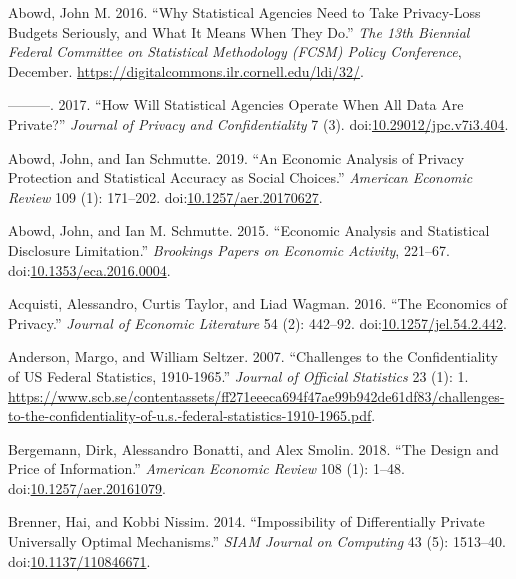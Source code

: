 \documentclass[]{article}
\begin{document}
\hypertarget{ref-abowd:fcsm:2016}{}
Abowd, John M. 2016. ``Why Statistical Agencies Need to Take
Privacy-Loss Budgets Seriously, and What It Means When They Do.''
\emph{The 13th Biennial Federal Committee on Statistical Methodology
(FCSM) Policy Conference}, December.
\url{https://digitalcommons.ilr.cornell.edu/ldi/32/}.

\hypertarget{ref-Abowd:JPC:2017}{}
---------. 2017. ``How Will Statistical Agencies Operate When All Data
Are Private?'' \emph{Journal of Privacy and Confidentiality} 7 (3).
doi:\href{https://doi.org/10.29012/jpc.v7i3.404}{10.29012/jpc.v7i3.404}.

\hypertarget{ref-AbowdSchmutte:Privacy:AER}{}
Abowd, John, and Ian Schmutte. 2019. ``An Economic Analysis of Privacy
Protection and Statistical Accuracy as Social Choices.'' \emph{American
Economic Review} 109 (1): 171--202.
doi:\href{https://doi.org/10.1257/aer.20170627}{10.1257/aer.20170627}.

\hypertarget{ref-abowdschmutteBPEA2015}{}
Abowd, John, and Ian M. Schmutte. 2015. ``Economic Analysis and
Statistical Disclosure Limitation.'' \emph{Brookings Papers on Economic
Activity}, 221--67.
doi:\href{https://doi.org/10.1353/eca.2016.0004}{10.1353/eca.2016.0004}.

\hypertarget{ref-acquisti:taylor:wagman:2015}{}
Acquisti, Alessandro, Curtis Taylor, and Liad Wagman. 2016. ``The
Economics of Privacy.'' \emph{Journal of Economic Literature} 54 (2):
442--92.
doi:\href{https://doi.org/10.1257/jel.54.2.442}{10.1257/jel.54.2.442}.

\hypertarget{ref-anderson:challenges:JOS:2007}{}
Anderson, Margo, and William Seltzer. 2007. ``Challenges to the
Confidentiality of US Federal Statistics, 1910-1965.'' \emph{Journal of
Official Statistics} 23 (1): 1.
\url{https://www.scb.se/contentassets/ff271eeeca694f47ae99b942de61df83/challenges-to-the-confidentiality-of-u.s.-federal-statistics-1910-1965.pdf}.

\hypertarget{ref-10.1257ux2faer.20161079}{}
Bergemann, Dirk, Alessandro Bonatti, and Alex Smolin. 2018. ``The Design
and Price of Information.'' \emph{American Economic Review} 108 (1):
1--48.
doi:\href{https://doi.org/10.1257/aer.20161079}{10.1257/aer.20161079}.

\hypertarget{ref-BrennerNissim:Impossibility:SIAM:2014}{}
Brenner, Hai, and Kobbi Nissim. 2014. ``Impossibility of Differentially
Private Universally Optimal Mechanisms.'' \emph{SIAM Journal on
Computing} 43 (5): 1513--40.
doi:\href{https://doi.org/10.1137/110846671}{10.1137/110846671}.
\end{document}
